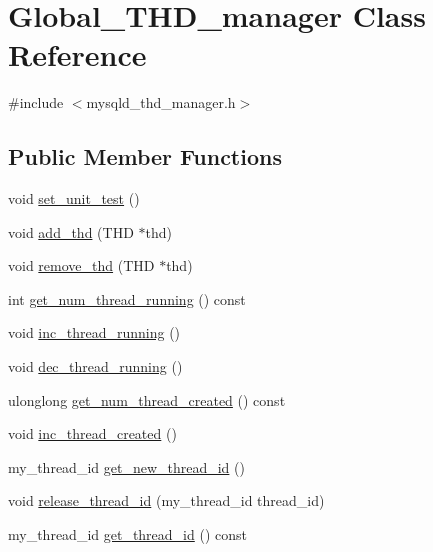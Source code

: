 \hypertarget{classGlobal__THD__manager}{}\section{Global\+\_\+\+T\+H\+D\+\_\+manager Class Reference}
\label{classGlobal__THD__manager}


{\ttfamily \#include $<$mysqld\+\_\+thd\+\_\+manager.\+h$>$}

\subsection*{Public Member Functions}
\begin{DoxyCompactItemize}
\item 
void \mbox{\hyperlink{classGlobal__THD__manager_a52d3e196c17357f3d5acea3c8aca6f02}{set\+\_\+unit\+\_\+test}} ()
\item 
void \mbox{\hyperlink{classGlobal__THD__manager_a0b2f6b235db53984b7c1ec63ee4a0dd9}{add\+\_\+thd}} (T\+HD $\ast$thd)
\item 
void \mbox{\hyperlink{classGlobal__THD__manager_acb2067c4549d412ac402e6941930f793}{remove\+\_\+thd}} (T\+HD $\ast$thd)
\item 
int \mbox{\hyperlink{classGlobal__THD__manager_a751a7e09cf025b578e425723a3fbe22e}{get\+\_\+num\+\_\+thread\+\_\+running}} () const
\item 
void \mbox{\hyperlink{classGlobal__THD__manager_a2c6d45fb36a523945c5c203341fbaaa0}{inc\+\_\+thread\+\_\+running}} ()
\item 
void \mbox{\hyperlink{classGlobal__THD__manager_a842edf9553aaf1a228b996299252273a}{dec\+\_\+thread\+\_\+running}} ()
\item 
ulonglong \mbox{\hyperlink{classGlobal__THD__manager_ac0634df07f20a646484ce05a484b6676}{get\+\_\+num\+\_\+thread\+\_\+created}} () const
\item 
void \mbox{\hyperlink{classGlobal__THD__manager_ad3b390bc64900597e7f71800b7b72a45}{inc\+\_\+thread\+\_\+created}} ()
\item 
my\+\_\+thread\+\_\+id \mbox{\hyperlink{classGlobal__THD__manager_a854e178c07d57bb7aa218f2cbca70808}{get\+\_\+new\+\_\+thread\+\_\+id}} ()
\item 
void \mbox{\hyperlink{classGlobal__THD__manager_a6486ba43b6018d27f72cbb0294d2c437}{release\+\_\+thread\+\_\+id}} (my\+\_\+thread\+\_\+id thread\+\_\+id)
\item 
my\+\_\+thread\+\_\+id \mbox{\hyperlink{classGlobal__THD__manager_a408b397cddb0f8b17108bd48e7b15464}{get\+\_\+thread\+\_\+id}} () const

\end{DoxyCompactItemize}
